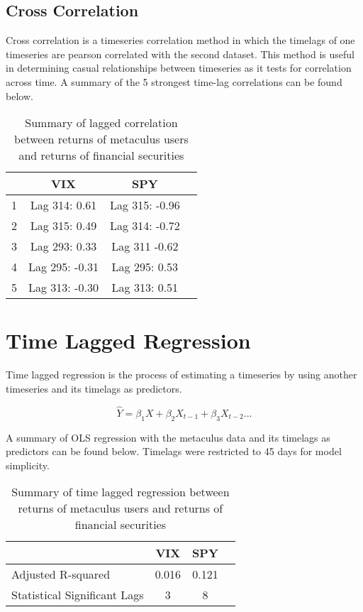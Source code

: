 \documentclass{article}
\begin{document}
\subsection*{Cross Correlation}
Cross correlation is a timeseries correlation method in which the timelags of one timeseries are pearson correlated with the second dataset. This method is useful in determining casual relationships between timeseries as it tests for correlation across time. A summary of the 5 strongest time-lag correlations can be found below.

\begin{table}[h]
    \centering
\begin{tabular}{l||ccc}
    \toprule
     & \textbf{VIX} & \textbf{SPY} & \\
    \midrule
    1 & Lag 314: 0.61 & Lag 315: -0.96 \\
    2 & Lag 315: 0.49 & Lag 314: -0.72\\
    3 & Lag 293: 0.33 & Lag 311 -0.62\\
    4 & Lag 295: -0.31 & Lag 295: 0.53\\
    5 & Lag 313: -0.30 & Lag 313: 0.51\\
    \bottomrule
\end{tabular}
\caption{Summary of lagged correlation between returns of metaculus users and returns of financial securities}
\end{table}


\section*{Time Lagged Regression}

Time lagged regression is the process of estimating a timeseries by using another timeseries and its timelags as predictors. 

$$
\hat{Y} = \beta_1 X + \beta_2 X_{t-1} + \beta_3 X_{t-2} ...
$$

A summary of OLS regression with the metaculus data and its timelags as predictors can be found below. Timelags were restricted to 45 days for model simplicity. 

\begin{table}[h]
    \centering
\begin{tabular}{l||ccc}
    \toprule
     & \textbf{VIX} & \textbf{SPY} & \\
    \midrule
    Adjusted R-squared & 0.016 & 0.121 \\
    Statistical Significant Lags & 3 & 8\\
    \bottomrule
\end{tabular}
\caption{Summary of time lagged regression between returns of metaculus users and returns of financial securities}
\end{table}
\end{document}
